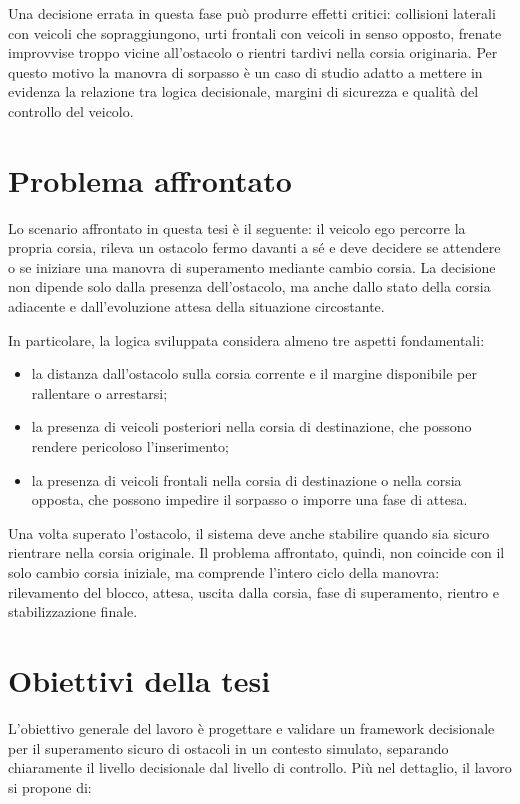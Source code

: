 Una decisione errata in questa fase può produrre effetti critici: collisioni laterali con veicoli che sopraggiungono, urti frontali con veicoli in senso opposto, frenate improvvise troppo vicine all'ostacolo o rientri tardivi nella corsia originaria. Per questo motivo la manovra di sorpasso è un caso di studio adatto a mettere in evidenza la relazione tra logica decisionale, margini di sicurezza e qualità del controllo del veicolo.

\section{Problema affrontato}

Lo scenario affrontato in questa tesi è il seguente: il veicolo ego percorre la propria corsia, rileva un ostacolo fermo davanti a sé e deve decidere se attendere o se iniziare una manovra di superamento mediante cambio corsia. La decisione non dipende solo dalla presenza dell'ostacolo, ma anche dallo stato della corsia adiacente e dall'evoluzione attesa della situazione circostante.

In particolare, la logica sviluppata considera almeno tre aspetti fondamentali:

\begin{itemize}
    \item la distanza dall'ostacolo sulla corsia corrente e il margine disponibile per rallentare o arrestarsi;
    \item la presenza di veicoli posteriori nella corsia di destinazione, che possono rendere pericoloso l'inserimento;
    \item la presenza di veicoli frontali nella corsia di destinazione o nella corsia opposta, che possono impedire il sorpasso o imporre una fase di attesa.
\end{itemize}

Una volta superato l'ostacolo, il sistema deve anche stabilire quando sia sicuro rientrare nella corsia originale. Il problema affrontato, quindi, non coincide con il solo cambio corsia iniziale, ma comprende l'intero ciclo della manovra: rilevamento del blocco, attesa, uscita dalla corsia, fase di superamento, rientro e stabilizzazione finale.

\section{Obiettivi della tesi}

L'obiettivo generale del lavoro è progettare e validare un framework decisionale per il superamento sicuro di ostacoli in un contesto simulato, separando chiaramente il livello decisionale dal livello di controllo. Più nel dettaglio, il lavoro si propone di:

